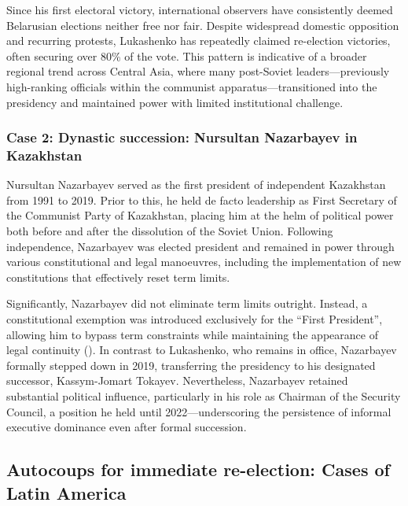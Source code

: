 \documentclass[
  12pt,
]{report}
\begin{document}
Since his first electoral victory, international observers have
consistently deemed Belarusian elections neither free nor fair. Despite
widespread domestic opposition and recurring protests, Lukashenko has
repeatedly claimed re-election victories, often securing over 80\% of
the vote. This pattern is indicative of a broader regional trend across
Central Asia, where many post-Soviet leaders---previously high-ranking
officials within the communist apparatus---transitioned into the
presidency and maintained power with limited institutional challenge.

\subsubsection*{Case 2: Dynastic succession: Nursultan Nazarbayev in
Kazakhstan}\label{case-2-dynastic-succession-nursultan-nazarbayev-in-kazakhstan}

Nursultan Nazarbayev served as the first president of independent
Kazakhstan from 1991 to 2019. Prior to this, he held de facto leadership
as First Secretary of the Communist Party of Kazakhstan, placing him at
the helm of political power both before and after the dissolution of the
Soviet Union. Following independence, Nazarbayev was elected president
and remained in power through various constitutional and legal
manoeuvres, including the implementation of new constitutions that
effectively reset term limits.

Significantly, Nazarbayev did not eliminate term limits outright.
Instead, a constitutional exemption was introduced exclusively for the
``First President'', allowing him to bypass term constraints while
maintaining the appearance of legal continuity
(). In contrast
to Lukashenko, who remains in office, Nazarbayev formally stepped down
in 2019, transferring the presidency to his designated successor,
Kassym-Jomart Tokayev. Nevertheless, Nazarbayev retained substantial
political influence, particularly in his role as Chairman of the
Security Council, a position he held until 2022---underscoring the
persistence of informal executive dominance even after formal
succession.

\subsection{Autocoups for immediate re-election: Cases of Latin
America}\label{autocoups-for-immediate-re-election-cases-of-latin-america}
\end{document}
